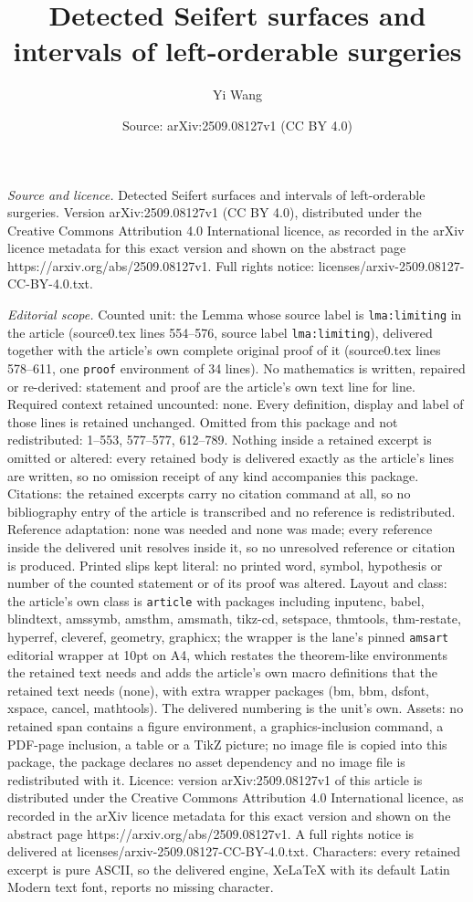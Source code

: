 \documentclass[10pt,a4paper]{amsart}
\title[Detected Seifert surfaces and intervals of left-orderable su]{Detected Seifert surfaces and intervals of left-orderable surgeries}
\author{Yi Wang}
\date{Source: arXiv:2509.08127v1 (CC BY 4.0)}
\begin{document}
\maketitle

\noindent\emph{Source and licence.} Detected Seifert surfaces and intervals of left-orderable surgeries. Version arXiv:2509.08127v1 (CC BY 4.0), distributed under the Creative Commons Attribution 4.0 International licence, as recorded in the arXiv licence metadata for this exact version and shown on the abstract page https://arxiv.org/abs/2509.08127v1. Full rights notice: licenses/arxiv-2509.08127-CC-BY-4.0.txt.\par\smallskip

\noindent\textit{Editorial scope.} Counted unit: the Lemma whose source label is \texttt{lma:limiting} in the article (source0.tex lines 554--576, source label \texttt{lma:limiting}), delivered together with the article's own complete original proof of it (source0.tex lines 578--611, one \texttt{proof} environment of 34 lines). No mathematics is written, repaired or re-derived: statement and proof are the article's own text line for line. Required context retained uncounted: none. Every definition, display and label of those lines is retained unchanged. Omitted from this package and not redistributed: 1--553, 577--577, 612--789. Nothing inside a retained excerpt is omitted or altered: every retained body is delivered exactly as the article's lines are written, so no omission receipt of any kind accompanies this package. Citations: the retained excerpts carry no citation command at all, so no bibliography entry of the article is transcribed and no reference is redistributed. Reference adaptation: none was needed and none was made; every reference inside the delivered unit resolves inside it, so no unresolved reference or citation is produced. Printed slips kept literal: no printed word, symbol, hypothesis or number of the counted statement or of its proof was altered. Layout and class: the article's own class is \texttt{article} with packages including inputenc, babel, blindtext, amssymb, amsthm, amsmath, tikz-cd, setspace, thmtools, thm-restate, hyperref, cleveref, geometry, graphicx; the wrapper is the lane's pinned \texttt{amsart} editorial wrapper at 10pt on A4, which restates the theorem-like environments the retained text needs and adds the article's own macro definitions that the retained text needs (none), with extra wrapper packages (bm, bbm, dsfont, xspace, cancel, mathtools). The delivered numbering is the unit's own. Assets: no retained span contains a figure environment, a graphics-inclusion command, a PDF-page inclusion, a table or a TikZ picture; no image file is copied into this package, the package declares no asset dependency and no image file is redistributed with it. Licence: version arXiv:2509.08127v1 of this article is distributed under the Creative Commons Attribution 4.0 International licence, as recorded in the arXiv licence metadata for this exact version and shown on the abstract page https://arxiv.org/abs/2509.08127v1. A full rights notice is delivered at licenses/arxiv-2509.08127-CC-BY-4.0.txt. Characters: every retained excerpt is pure ASCII, so the delivered engine, XeLaTeX with its default Latin Modern text font, reports no missing character.
\end{document}
